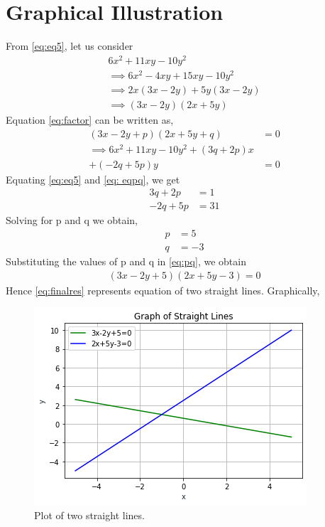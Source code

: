 \documentclass[journal,12pt,twocolumn]{IEEEtran}
\begin{document}
\section{Graphical Illustration}
From \eqref{eq:eq5}, let us consider
\begin{align}
	6x^2 + 11xy - 10y^2 \\
	\implies 6x^2 - 4xy + 15xy - 10y^2\\
	\implies 2x(3x - 2y) + 5y(3x - 2y)\\
	\implies (3x - 2y)(2x + 5y) \label{eq:factor}
\end{align}
Equation \eqref{eq:factor} can be written as,
\begin{align}
	(3x - 2y + p)(2x + 5y + q) &= 0 \label{eq:pq} \\
	\implies 6x^2 + 11xy - 10y^2 + (3q + 2p)x \nonumber \\+ (-2q + 5p)y &= 0 \label{eq: eqpq}
\end{align}
Equating \eqref{eq:eq5} and \eqref{eq: eqpq}, we get
\begin{align}
	3q + 2p &= 1\\
	-2q + 5p &= 31
\end{align}
Solving for p and q we obtain,
\begin{align}
	p &= 5 \label{eq:p_val} \\
	q&= -3 \label{eq:q_val}
\end{align}
Substituting the values of p and q in \eqref{eq:pq}, we obtain
\begin{align}
	(3x - 2y + 5)(2x + 5y - 3) = 0 \label{eq:finalres}
\end{align}
Hence \eqref{eq:finalres} represents equation of two straight lines.
Graphically,
\renewcommand{\thefigure}{\arabic{figure}}
\begin{figure}[!ht] \label{fig:straight_lines}
	\centering
	\includegraphics[width=\columnwidth]{a6_graph.png}
	\caption{Plot of two straight lines.}
\end{figure}
\end{document}
